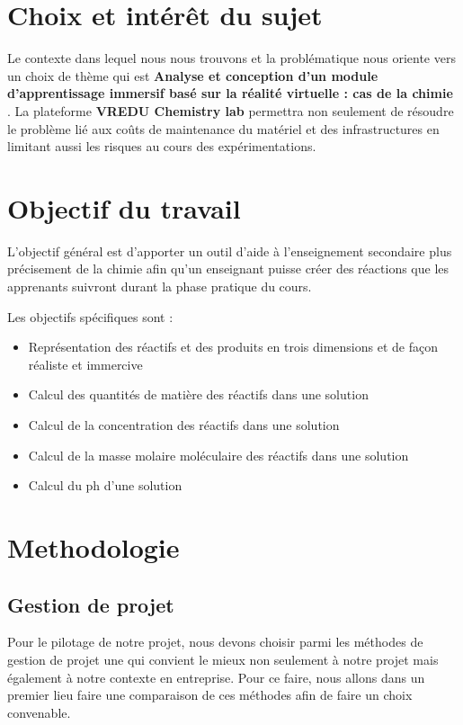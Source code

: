 \section{Choix et intérêt du sujet}

Le contexte dans lequel nous nous trouvons et la problématique nous oriente vers un
choix de thème qui est \textbf{\og Analyse et conception d'un module d'apprentissage immersif basé sur la réalité virtuelle : cas de la chimie \fg}.
La plateforme \textbf{VREDU Chemistry lab} permettra non seulement de résoudre le problème lié aux coûts de maintenance
du matériel et des infrastructures en limitant aussi les risques au cours des expérimentations.

\section{Objectif du travail}

L’objectif général est d'apporter un outil d'aide à l'enseignement secondaire plus précisement de la chimie
afin qu'un enseignant puisse créer des réactions que les apprenants suivront durant la phase pratique du cours.

Les objectifs spécifiques sont :

\begin{itemize}
	\item Représentation des réactifs et des produits en trois dimensions et de façon réaliste et immercive
	\item Calcul des quantités de matière des réactifs dans une solution
	\item Calcul de la concentration des réactifs dans une solution
	\item Calcul de la masse molaire moléculaire des réactifs dans une solution
	\item Calcul du ph d’une solution
\end{itemize}

\section{Methodologie}

\subsection{Gestion de projet}

Pour le pilotage de notre projet, nous devons choisir parmi les méthodes de gestion de
projet une qui convient le mieux non seulement à notre projet mais également à notre contexte
en entreprise. Pour ce faire, nous allons dans un premier lieu faire une comparaison de ces
méthodes afin de faire un choix convenable.

